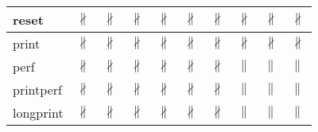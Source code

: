 \documentclass[10pt]{article}
\begin{document}
\begin{longtable}{|l|l|l|l|l|l|l|l|l|l|}
\hline
reset&{\color{BrickRed}$\nparallel$}&{\color{BrickRed}$\nparallel$}&{\color{BrickRed}$\nparallel$}&{\color{BrickRed}$\nparallel$}&{\color{BrickRed}$\nparallel$}&{\color{BrickRed}$\nparallel$}&{\color{BrickRed}$\nparallel$}&{\color{BrickRed}$\nparallel$}&{\color{BrickRed}$\nparallel$}\\
\hline
print&{\color{BrickRed}$\nparallel$}&{\color{BrickRed}$\nparallel$}&{\color{BrickRed}$\nparallel$}&{\color{BrickRed}$\nparallel$}&{\color{BrickRed}$\nparallel$}&{\color{BrickRed}$\nparallel$}&{\color{BrickRed}$\nparallel$}&{\color{BrickRed}$\nparallel$}&{\color{BrickRed}$\nparallel$}\\
\hline
perf&{\color{BrickRed}$\nparallel$}&{\color{BrickRed}$\nparallel$}&{\color{BrickRed}$\nparallel$}&{\color{BrickRed}$\nparallel$}&{\color{BrickRed}$\nparallel$}&{\color{BrickRed}$\nparallel$}&{\color{blue}$\parallel$}&{\color{blue}$\parallel$}&{\color{blue}$\parallel$}\\
\hline
printperf&{\color{BrickRed}$\nparallel$}&{\color{BrickRed}$\nparallel$}&{\color{BrickRed}$\nparallel$}&{\color{BrickRed}$\nparallel$}&{\color{BrickRed}$\nparallel$}&{\color{BrickRed}$\nparallel$}&{\color{blue}$\parallel$}&{\color{blue}$\parallel$}&{\color{blue}$\parallel$}\\
\hline
longprint&{\color{BrickRed}$\nparallel$}&{\color{BrickRed}$\nparallel$}&{\color{BrickRed}$\nparallel$}&{\color{BrickRed}$\nparallel$}&{\color{BrickRed}$\nparallel$}&{\color{BrickRed}$\nparallel$}&{\color{blue}$\parallel$}&{\color{blue}$\parallel$}&{\color{blue}$\parallel$}\\
\hline
\end{longtable}
\newpage
\end{document}
